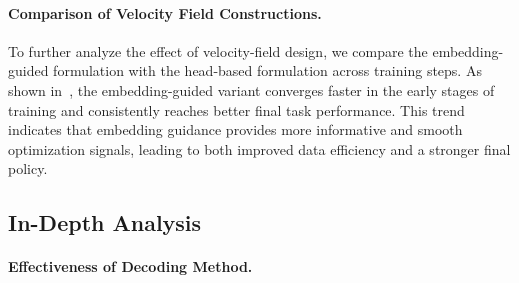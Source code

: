 \paragraph{Comparison of Velocity Field Constructions.}
To further analyze the effect of velocity-field design, we compare the embedding-guided formulation with the head-based formulation across training steps. As shown in~, the embedding-guided variant converges faster in the early stages of training and consistently reaches better final task performance. This trend indicates that embedding guidance provides more informative and smooth optimization signals, leading to both improved data efficiency and a stronger final policy.




\subsection{In-Depth Analysis}
\label{sec:analysis}

\paragraph{Effectiveness of Decoding Method.}

